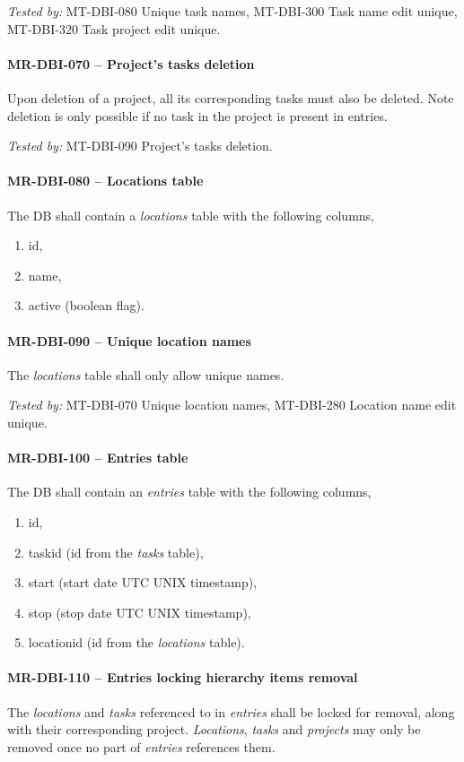 \textit{Tested by: } MT-DBI-080 Unique task names,
MT-DBI-300 Task name edit unique,
MT-DBI-320 Task project edit unique.

\paragraph{MR-DBI-070 -- Project's tasks deletion}
Upon deletion of a project, all its corresponding tasks must also
be deleted.
Note deletion is only possible if no task in the project is present
in entries.

\textit{Tested by: } MT-DBI-090 Project's tasks deletion.

\paragraph{MR-DBI-080 -- Locations table}
The \gls{DB} shall contain a \emph{locations} table with the following columns,
\begin{enumerate}
\item id,
\item name,
\item active (boolean flag).
\end{enumerate}

\paragraph{MR-DBI-090 -- Unique location names}
The \emph{locations} table shall only allow unique names.

\textit{Tested by: } MT-DBI-070 Unique location names,
MT-DBI-280 Location name edit unique.

\paragraph{MR-DBI-100 -- Entries table}
The \gls{DB} shall contain an \emph{entries} table with the following columns,
\begin{enumerate}
\item id,
\item task\textunderscore id (id from the \emph{tasks} table),
\item start (start date UTC UNIX timestamp),
\item stop (stop date UTC UNIX timestamp),
\item location\textunderscore id (id from the \emph{locations} table).
\end{enumerate}

\paragraph{MR-DBI-110 -- Entries locking hierarchy items removal}
The \emph{locations} and \emph{tasks} referenced to in \emph{entries} shall be
locked for removal, along with their corresponding project. \emph{Locations},
\emph{tasks} and \emph{projects} may only be removed once no part of
\emph{entries} references them.

